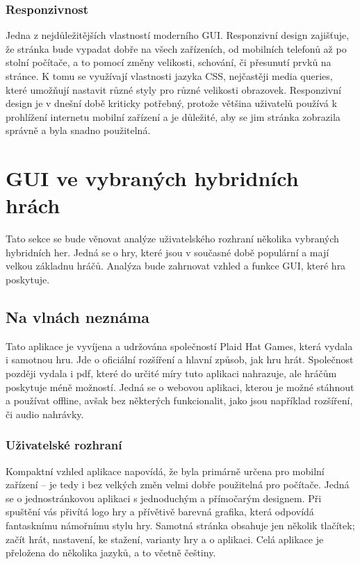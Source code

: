 \subsubsection*{Responzivnost}
Jedna z nejdůležitějších vlastností moderního GUI. Responzivní design zajišťuje, že stránka bude vypadat dobře na všech zařízeních, od mobilních telefonů až po stolní počítače, a to pomocí změny velikosti, schování, či přesunutí prvků na stránce. K tomu se využívají vlastnosti jazyka CSS, nejčastěji media queries, které umožňují nastavit různé styly pro různé velikosti obrazovek. Responzivní design je v dnešní době kriticky potřebný, protože většina uživatelů používá k prohlížení internetu mobilní zařízení a je důležité, aby se jim stránka zobrazila správně a byla snadno použitelná.\cite{responsive_design}

\section{GUI ve vybraných hybridních hrách}
Tato sekce se bude věnovat analýze uživatelského rozhraní několika vybraných hybridních her. Jedná se o hry, které jsou v současné době populární a mají velkou základnu hráčů. Analýza bude zahrnovat vzhled a funkce GUI, které hra poskytuje.

\subsection{Na vlnách neznáma}
Tato aplikace je vyvíjena a udržována společností Plaid Hat Games, která vydala i samotnou hru. Jde o oficiální rozšíření a hlavní způsob, jak hru hrát. Společnost později vydala i pdf, které do určité míry tuto aplikaci nahrazuje, ale hráčům poskytuje méně možností. Jedná se o webovou aplikaci, kterou je možné stáhnout a používat offline, avšak bez některých funkcionalit, jako jsou například rozšíření, či audio nahrávky.

\subsubsection*{Uživatelské rozhraní}
Kompaktní vzhled aplikace napovídá, že byla primárně určena pro mobilní zařízení -- je tedy i bez velkých změn velmi dobře použitelná pro počítače. Jedná se o jednostránkovou aplikaci s jednoduchým a přímočarým designem. Při spuštění vás přivítá logo hry a přívětivě barevná grafika, která odpovídá fantasknímu námořnímu stylu hry. Samotná stránka obsahuje jen několik tlačítek; začít hrát, nastavení, ke stažení, varianty hry a o aplikaci. Celá aplikace je přeložena do několika jazyků, a to včetně češtiny.


